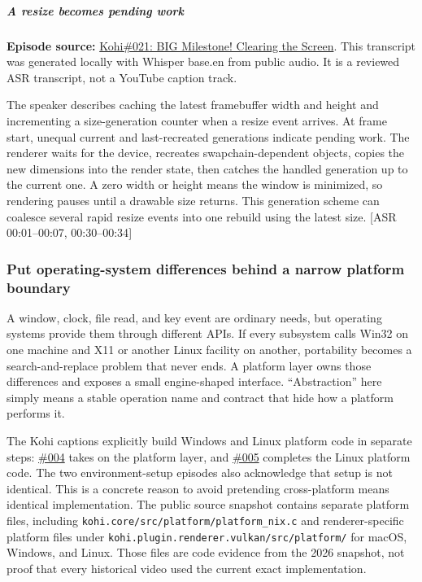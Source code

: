 \subparagraph{A resize becomes pending work}\label{a-resize-becomes-pending-work}

\textbf{Episode source:} \href{https://www.youtube.com/watch?v=hRL71D1f3pU}{Kohi\#021: BIG Milestone! Clearing the Screen}. This transcript was generated locally with Whisper base.en from public audio. It is a reviewed ASR transcript, not a YouTube caption track.

The speaker describes caching the latest framebuffer width and height and incrementing a size-generation counter when a resize event arrives. At frame start, unequal current and last-recreated generations indicate pending work. The renderer waits for the device, recreates swapchain-dependent objects, copies the new dimensions into the render state, then catches the handled generation up to the current one. A zero width or height means the window is minimized, so rendering pauses until a drawable size returns. This generation scheme can coalesce several rapid resize events into one rebuild using the latest size. {[}ASR 00:01--00:07, 00:30--00:34{]}

\subsubsection{Put operating-system differences behind a narrow platform boundary}\label{put-operating-system-differences-behind-a-narrow-platform-boundary}

A window, clock, file read, and key event are ordinary needs, but operating systems provide them through different APIs. If every subsystem calls Win32 on one machine and X11 or another Linux facility on another, portability becomes a search-and-replace problem that never ends. A platform layer owns those differences and exposes a small engine-shaped interface. ``Abstraction'' here simply means a stable operation name and contract that hide how a platform performs it.

The Kohi captions explicitly build Windows and Linux platform code in separate steps: \href{https://www.youtube.com/watch?v=ojEPsZFPj2Q}{\#004} takes on the platform layer, and \href{https://www.youtube.com/watch?v=nGgvWzoCsyk}{\#005} completes the Linux platform code. The two environment-setup episodes also acknowledge that setup is not identical. This is a concrete reason to avoid pretending cross-platform means identical implementation. The public source snapshot contains separate platform files, including \texttt{kohi.core/src/platform/platform\_nix.c} and renderer-specific platform files under \texttt{kohi.plugin.renderer.vulkan/src/platform/} for macOS, Windows, and Linux. Those files are code evidence from the 2026 snapshot, not proof that every historical video used the current exact implementation.

